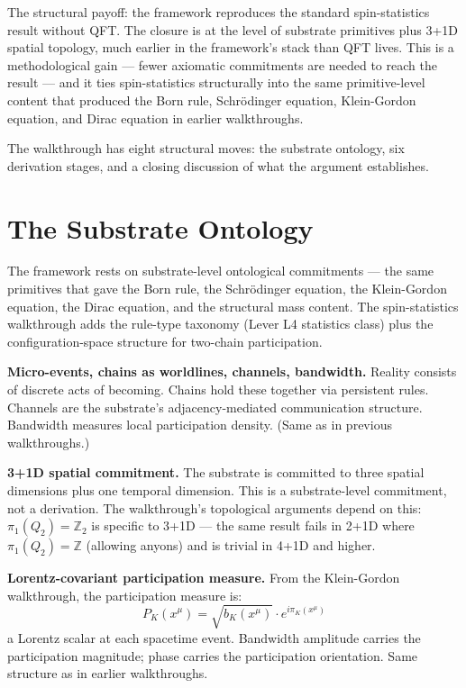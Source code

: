 \documentclass[11pt,a4paper]{article}
\begin{document}
The structural payoff: the framework reproduces the standard spin-statistics result without QFT. The closure is at the level of substrate primitives plus 3+1D spatial topology, much earlier in the framework's stack than QFT lives. This is a methodological gain --- fewer axiomatic commitments are needed to reach the result --- and it ties spin-statistics structurally into the same primitive-level content that produced the Born rule, Schr\"odinger equation, Klein-Gordon equation, and Dirac equation in earlier walkthroughs.

The walkthrough has eight structural moves: the substrate ontology, six derivation stages, and a closing discussion of what the argument establishes.

\section{The Substrate Ontology}

The framework rests on substrate-level ontological commitments --- the same primitives that gave the Born rule, the Schr\"odinger equation, the Klein-Gordon equation, the Dirac equation, and the structural mass content. The spin-statistics walkthrough adds the rule-type taxonomy (Lever L4 statistics class) plus the configuration-space structure for two-chain participation.

\textbf{Micro-events, chains as worldlines, channels, bandwidth.} Reality consists of discrete acts of becoming. Chains hold these together via persistent rules. Channels are the substrate's adjacency-mediated communication structure. Bandwidth measures local participation density. (Same as in previous walkthroughs.)

\textbf{3+1D spatial commitment.} The substrate is committed to three spatial dimensions plus one temporal dimension. This is a substrate-level commitment, not a derivation. The walkthrough's topological arguments depend on this: $\pi_1(Q_2) = \mathbb{Z}_2$ is specific to 3+1D --- the same result fails in 2+1D where $\pi_1(Q_2) = \mathbb{Z}$ (allowing anyons) and is trivial in 4+1D and higher.

\textbf{Lorentz-covariant participation measure.} From the Klein-Gordon walkthrough, the participation measure is:
\[
P_K(x^\mu) = \sqrt{b_K(x^\mu)} \cdot e^{i\pi_K(x^\mu)}
\]
a Lorentz scalar at each spacetime event. Bandwidth amplitude carries the participation magnitude; phase carries the participation orientation. Same structure as in earlier walkthroughs.
\end{document}
